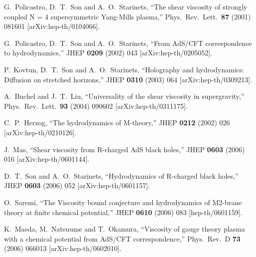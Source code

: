 \begin{thebibliography}{99}
  G.~Policastro, D.~T.~Son and A.~O.~Starinets,
  ``The shear viscosity of strongly coupled N = 4 supersymmetric Yang-Mills
  plasma,''
  Phys.\ Rev.\ Lett.\  {\bf 87} (2001) 081601
  [arXiv:hep-th/0104066].

  G.~Policastro, D.~T.~Son and A.~O.~Starinets,
  ``From AdS/CFT correspondence to hydrodynamics,''
  JHEP {\bf 0209} (2002) 043
  [arXiv:hep-th/0205052].
  

  P.~Kovtun, D.~T.~Son and A.~O.~Starinets,
  ``Holography and hydrodynamics: Diffusion on stretched horizons,''
  JHEP {\bf 0310} (2003) 064
  [arXiv:hep-th/0309213].

  A.~Buchel and J.~T.~Liu,
  ``Universality of the shear viscosity in supergravity,''
  Phys.\ Rev.\ Lett.\  {\bf 93} (2004) 090602
  [arXiv:hep-th/0311175].
  

  C.~P.~Herzog,
  ``The hydrodynamics of M-theory,''
  JHEP {\bf 0212} (2002) 026
  [arXiv:hep-th/0210126].

  
  J.~Mas,
  ``Shear viscosity from R-charged AdS black holes,''
  JHEP {\bf 0603} (2006) 016
  [arXiv:hep-th/0601144].

  D.~T.~Son and A.~O.~Starinets,
  ``Hydrodynamics of R-charged black holes,''
  JHEP {\bf 0603} (2006) 052
  [arXiv:hep-th/0601157].

  O.~Saremi,
  ``The Viscosity bound conjecture and hydrodynamics of M2-brane theory at finite chemical potential,''
  JHEP {\bf 0610} (2006) 083
  [hep-th/0601159].

  K.~Maeda, M.~Natsuume and T.~Okamura,
  ``Viscosity of gauge theory plasma with a chemical potential from AdS/CFT correspondence,''
  Phys.\ Rev.\ D {\bf 73} (2006) 066013
  [arXiv:hep-th/0602010].


\end{thebibliography}
